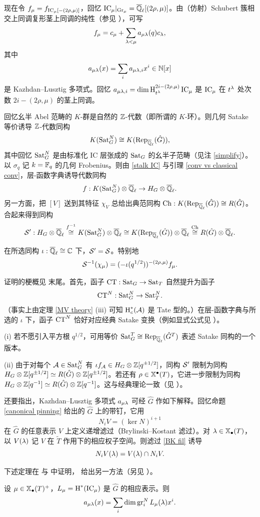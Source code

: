 现在令 $f_\mu=f_{{\operatorname{IC}}_\mu[-(2\rho,\mu)]}$，回忆 ${\operatorname{IC}}_\mu|_{{\operatorname{Gr}}_\mu}={\overline{{\mathbb Q}}_\ell}[(2\rho,\mu)]$。由（仿射）Schubert 簇相交上同调复形茎上同调的纯性（参见 \cite{KL}），可写
\begin{equation}\label{stalk IC}
f_\mu=c_\mu+\sum_{{\lambda}<\mu}a_{\mu{\lambda}}(q)c_{\lambda},
\end{equation}
其中
\[a_{\mu{\lambda}}(x)=\sum_i a_{\mu{\lambda},i}x^i\in {\mathbb N}[x]\]
是 Kazhdan--Lusztig 多项式。回忆 $a_{\mu{\lambda},i}=\dim \operatorname{H}^{2i-(2\rho,\mu)}_{t^{\lambda}}{\operatorname{IC}}_\mu$ 是 ${\operatorname{IC}}_\mu$ 在 $t^{\lambda}$ 处次数 $2i-(2\rho,\mu)$ 的茎上同调。

回忆幺半 Abel 范畴的 $K$-群是自然的 ${\mathbb Z}$-代数（即所谓的 $K$-环）。则几何 Satake 等价诱导 ${\mathbb Z}$-代数同构
\[K({\operatorname{Sat}}_G^N)\cong K(\operatorname{Rep}_{\overline{{\mathbb Q}}_\ell}(\hat G)),\]
其中回忆 ${\operatorname{Sat}}_G^N$ 是由标准化 IC 层张成的 ${\operatorname{Sat}}_G$ 的幺半子范畴（见注 \ref{simplify}）。以 $\sigma_q$ 记 $k={\mathbb F}_q$ 的几何 Frobenius。则由 \eqref{stalk IC} 与引理 \ref{conv vs classical conv}，层-函数字典诱导代数同构
\[f: K({\operatorname{Sat}}_G^N)\otimes{\overline{{\mathbb Q}}_\ell}\to H_G\otimes{\overline{{\mathbb Q}}_\ell}.\]
另一方面，把 $[V]$ 送到其特征 $\chi_V$ 总给出典范同构 $\operatorname{Ch}:K(\operatorname{Rep}_{\overline{{\mathbb Q}}_\ell}(\hat G))\cong R(\hat G)$。合起来得到同构
\[{\mathcal S}':H_G\otimes{\overline{{\mathbb Q}}_\ell}\stackrel{f^{-1}}{\cong} K({\operatorname{Sat}}_G^N)\otimes{\overline{{\mathbb Q}}_\ell} \cong K(\operatorname{Rep}_{\overline{{\mathbb Q}}_\ell}(\hat G))\otimes{\overline{{\mathbb Q}}_\ell}\stackrel{\operatorname{Ch}}{\cong}R(\hat G)\otimes{\overline{{\mathbb Q}}_\ell}.\]

\begin{lem}
在所选同构 $\iota:{\overline{{\mathbb Q}}_\ell}\cong{\mathbb C}$ 下，${\mathcal S}'={\mathcal S}$。特别地
\[{\mathcal S}^{-1}(\chi_\mu)=(-\iota(q^{1/2}))^{-(2\rho,\mu)}f_\mu.\]
\end{lem}

证明的梗概见 \cite{RZ} 末尾。首先，函子 $\operatorname{CT}:{\operatorname{Sat}}_G\to {\operatorname{Sat}}_T$ 自然提升为函子
\[\operatorname{CT}^N: {\operatorname{Sat}}_G^N\to {\operatorname{Sat}}_T^N.\]
（事实上由定理 \ref{MV theory} (iii) 可知 $\operatorname{H}_c^*({\mathcal A})$ 是 Tate 型的。）在层-函数字典与所选的 $\iota$ 下，函子 $\operatorname{CT}^N$ 恰好对应经典 Satake 变换（例如显式公式见 \cite[\S\ 3]{Gr}）。

\begin{rmk}
(i) 若不愿引入平方根 $q^{1/2}$，可用等价 ${\operatorname{Sat}}_G^T\cong \operatorname{Rep}_{\overline{{\mathbb Q}}_\ell}(\hat G^T)$ 表述 Satake 同构的一个版本。

(ii) 由于对每个 ${\mathcal A}\in {\operatorname{Sat}}_G^N$ 有 $\iota f_{\mathcal A}\in H_G\otimes{\mathbb Z}[q^{\pm 1/2}]$，同构 ${\mathcal S}'$ 限制为同构 $H_G\otimes {\mathbb Z}[q^{\pm 1/2}]\simeq R(\hat G)\otimes {\mathbb Z}[q^{\pm 1/2}]$。若还有 $\rho\in \mathbb{X}^\bullet(T)$，它进一步限制为同构 $H_G\otimes{\mathbb Z}[q^{-1}]\simeq R(\hat G)\otimes{\mathbb Z}[q^{-1}]$。这与经典理论一致（见 \cite[\S 3]{Gr}）。
\end{rmk}

还要指出，Kazhdan--Lusztig 多项式 $a_{\mu{\lambda}}$ 可经 $\hat G$ 作如下解释。回忆命题 \ref{canonical pinning} 给出的 $\hat G$ 上的带钉，它用
\begin{equation}\label{BK fil}
N_iV=(\ker N)^{i+1}
\end{equation}
在 $\hat G$ 的任意表示 $V$ 上定义递增滤过（Brylinski--Kostant 滤过）。对 ${\lambda}\in\mathbb{X}_\bullet(T)$，以 $V({\lambda})$ 记 $V$ 在 $\tilde T$ 作用下的相应权子空间。则滤过 \eqref{BK fil} 诱导
\begin{equation}\label{BKfilmu}
N_iV({\lambda})=V({\lambda})\cap N_iV.
\end{equation}

下述定理在 \cite{Lu} 与 \cite{Bry} 中证明，\cite[\S~5]{Gi1} 给出另一方法（另见 \cite[\S~5]{Z11}）。

\begin{thm}
设 $\mu\in\mathbb{X}_\bullet(T)^+$，$L_\mu=\operatorname{H}^*({\operatorname{IC}}_\mu)$ 是 $\hat G$ 的相应表示。则
\[a_{\mu{\lambda}}(x)=\sum_i \dim \operatorname{gr}^N_iL_\mu({\lambda})x^i.\]
\end{thm}
